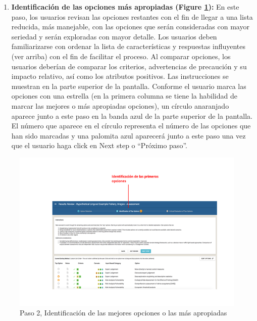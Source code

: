 \documentclass[
  11pt,
]{book}
\providecommand{\tightlist}{%
  \setlength{\itemsep}{0pt}\setlength{\parskip}{0pt}}
\begin{document}
\begin{enumerate}
\def\labelenumi{\arabic{enumi}.}
\setcounter{enumi}{1}
\tightlist
\item
  \textbf{Identificación de las opciones más apropiadas (Figure \ref{fig:review-step-2}):} En este paso, los usuarios revisan las opciones restantes con el fin de llegar a una lista reducida, más manejable, con las opciones que serán consideradas con mayor seriedad y serán exploradas con mayor detalle. Los usuarios deben familiarizarse con ordenar la lista de características y respuestas influyentes (ver arriba) con el fin de facilitar el proceso. Al comparar opciones, los usuarios deberían de comparar los criterios, advertencias de precaución y su impacto relativo, así como los atributos positivos. Las instrucciones se muestran en la parte superior de la pantalla. Conforme el usuario marca las opciones con una estrella (en la primera columna se tiene la habilidad de marcar las mejores o más apropiadas opciones), un círculo anaranjado aparece junto a este paso en la banda azul de la parte superior de la pantalla. El número que aparece en el círculo representa el número de las opciones que han sido marcadas y una palomita azul aparecerá junto a este paso una vez que el usuario haga click en Next step o ``Próximo paso''.
\end{enumerate}

\begin{figure}

{\centering \includegraphics[width=0.95\linewidth]{images/review-step-2-es} 

}

\caption{Paso 2, Identificación de las mejores opciones o las más apropiadas}\label{fig:review-step-2}
\end{figure}
\end{document}
